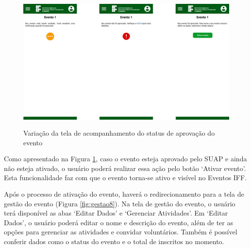 \begin{figure}[H]
    \centering
    \caption{Variação da tela de acompanhamento do status de aprovação do evento}
    \includegraphics[scale=0.47]{figuras/Gestao/5-6-7.jpg}
    \label{fig:gestao5}
\end{figure}

Como apresentado na Figura  \ref{fig:gestao5}, caso o evento esteja aprovado pelo SUAP e ainda não esteja ativado, o usuário poderá realizar essa ação pelo botão ‘Ativar evento’. Esta funcionalidade faz com que o evento torna-se ativo e visível no Eventos IFF.

Após o processo de ativação do evento, haverá o redirecionamento para a tela de gestão do evento (Figura \ref{fig:gestao8}). Na tela de gestão do evento, o usuário terá disponível as abas ‘Editar Dados’ e ‘Gerenciar Atividades’. Em ‘Editar Dados’, o usuário poderá editar o nome e descrição do evento, além de ter as opções para gerenciar as atividades e convidar voluntários. Também é possível conferir dados como o status do evento e o total de inscritos no momento.

